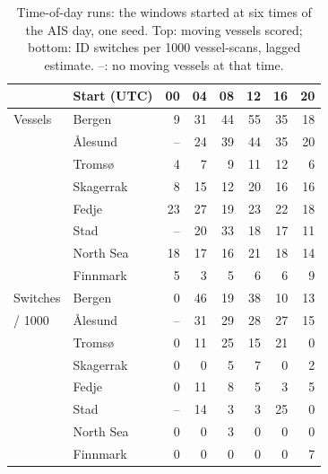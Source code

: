 \begin{table}[htbp]
\centering
\caption{Time-of-day runs: the windows started at six times of the AIS day, one seed. Top: moving vessels scored; bottom: ID switches per 1000 vessel-scans, lagged estimate. --: no moving vessels at that time.}
\label{tab:res-time-of-day}
\small
\begin{tabular}{l l r r r r r r}
\toprule
& Start (UTC) & 00 & 04 & 08 & 12 & 16 & 20 \\
\midrule
Vessels & Bergen & 9 & 31 & 44 & 55 & 35 & 18 \\
 & Ålesund & -- & 24 & 39 & 44 & 35 & 20 \\
 & Tromsø & 4 & 7 & 9 & 11 & 12 & 6 \\
 & Skagerrak & 8 & 15 & 12 & 20 & 16 & 16 \\
 & Fedje & 23 & 27 & 19 & 23 & 22 & 18 \\
 & Stad & -- & 20 & 33 & 18 & 17 & 11 \\
 & North Sea & 18 & 17 & 16 & 21 & 18 & 14 \\
 & Finnmark & 5 & 3 & 5 & 6 & 6 & 9 \\
\midrule
Switches & Bergen & 0 & 46 & 19 & 38 & 10 & 13 \\
/ 1000 & Ålesund & -- & 31 & 29 & 28 & 27 & 15 \\
 & Tromsø & 0 & 11 & 25 & 15 & 21 & 0 \\
 & Skagerrak & 0 & 0 & 5 & 7 & 0 & 2 \\
 & Fedje & 0 & 11 & 8 & 5 & 3 & 5 \\
 & Stad & -- & 14 & 3 & 3 & 25 & 0 \\
 & North Sea & 0 & 0 & 3 & 0 & 0 & 0 \\
 & Finnmark & 0 & 0 & 0 & 0 & 0 & 7 \\
\bottomrule
\end{tabular}
\end{table}


